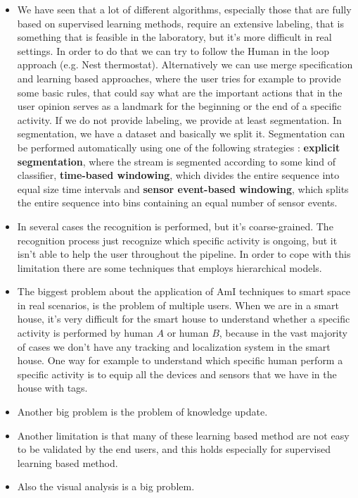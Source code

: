 \documentclass[11pt]{article}
\begin{document}
\begin{itemize}
\item We have seen that a lot of different algorithms, especially those that are fully based on supervised learning methods, require an extensive labeling, that is something that is feasible in the laboratory, but it's more difficult in real settings. In order to do that we can try to follow the Human in the loop approach (e.g. Nest thermostat). Alternatively we can use merge specification and learning based approaches, where the user tries for example to provide some basic rules, that could say what are the important actions that in the user opinion serves as a landmark for the beginning or the end of a specific activity. If we do not provide labeling, we provide at least segmentation. In segmentation, we have a dataset and basically we split it. Segmentation can be performed automatically using one of the following strategies : \textbf{explicit segmentation}, where the stream is segmented according to some kind of classifier, \textbf{time-based windowing}, which divides the entire sequence into equal size time intervals and \textbf{sensor event-based windowing}, which splits the entire sequence into bins containing an equal number of sensor events.

\item In several cases the recognition is performed, but it's coarse-grained. The recognition process just recognize which specific activity is ongoing, but it isn't able to help the user throughout the pipeline. In order to cope with this limitation there are some techniques that employs hierarchical models. 

\item The biggest problem about the application of AmI techniques to smart space in real scenarios, is the problem of multiple users. When we are in a smart house, it's very difficult for the smart house to understand whether a specific activity is performed by human $A$ or human $B$, because in the vast majority of cases we don't have any tracking and localization system in the smart house. One way for example to understand which specific human perform a specific activity is to equip all the devices and sensors that we have in the house with tags.

\item Another big problem is the problem of knowledge update.

\item Another limitation is that many of these learning based method are not easy to be validated by the end users, and this holds especially for supervised learning based method.

\item Also the visual analysis is a big problem.
\end{itemize}
\end{document}
